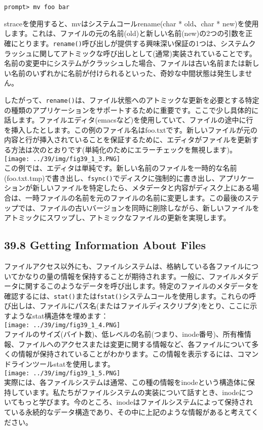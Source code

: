 \begin{verbatim}
prompt> mv foo bar
\end{verbatim}

straceを使用すると、mvはシステムコールrename(char * old、char *
new)を使用します。これは、ファイルの元の名前(old)と新しい名前(new)の2つの引数を正確にとります。\texttt{rename()}呼び出しが提供する興味深い保証の1つは、システムクラッシュに関してアトミックな呼び出しとして(通常)実装されていることです。名前の変更中にシステムがクラッシュした場合、ファイルは古い名前または新しい名前のいずれかに名前が付けられるといった、奇妙な中間状態は発生しません。

したがって、\texttt{rename()}は、ファイル状態へのアトミックな更新を必要とする特定の種類のアプリケーションをサポートするために重要です。ここで少し具体的に話します。ファイルエディタ(emacsなど)を使用していて、ファイルの途中に行を挿入したとします。この例のファイル名はfoo.txtです。新しいファイルが元の内容と行が挿入されていることを保証するために、エディタがファイルを更新する方法は次のとおりです(単純化のためにエラーチェックを無視します)。\\
\texttt{[image: ../39/img/fig39\_1\_3.PNG]}\\
この例では、エディタは単純です。新しい名前のファイルを一時的な名前(foo.txt.tmp)で書き出し、\texttt{fsync()}でディスクに強制的に書き出し、アプリケーションが新しいファイルを特定したら、メタデータと内容がディスク上にある場合は、一時ファイルの名前を元のファイルの名前に変更します。この最後のステップでは、ファイルの古いバージョンを同時に削除しながら、新しいファイルをアトミックにスワップし、アトミックなファイルの更新を実現します。

\hypertarget{getting-information-about-files}{%
\subsection*{39.8 Getting Information About
Files}\label{getting-information-about-files}}

ファイルアクセス以外にも、ファイルシステムは、格納している各ファイルについてかなりの量の情報を保持することが期待されます。一般に、ファイルメタデータに関するこのようなデータを呼び出します。特定のファイルのメタデータを確認するには、\texttt{stat()}または\texttt{fstat()}システムコールを使用します。これらの呼び出しは、ファイルにパス名(またはファイルディスクリプタ)をとり、ここに示すようなstat構造体を埋めます：\\
\texttt{[image: ../39/img/fig39\_1\_4.PNG]}\\
ファイルのサイズ(バイト数)、低レベルの名前(つまり、inode番号)、所有権情報、ファイルへのアクセスまたは変更に関する情報など、各ファイルについて多くの情報が保持されていることがわかります。この情報を表示するには、コマンドラインツールstatを使用します。\\
\texttt{[image: ../39/img/fig39\_1\_5.PNG]}\\
実際には、各ファイルシステムは通常、この種の情報をinodeという構造体に保持しています。私たちがファイルシステムの実装について話すとき、inodeについてもっと学びます。今のところ、inodeはファイルシステムによって保持されている永続的なデータ構造であり、その中に上記のような情報があると考えてください。

